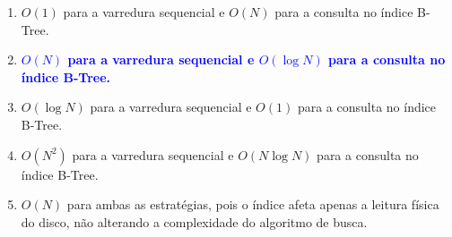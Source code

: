 \documentclass[12pt,a4paper]{article}
\begin{document}
\begin{enumerate}
    \begin{enumerate}[label=\alph*)]
        \item $O(1)$ para a varredura sequencial e $O(N)$ para a consulta no índice B-Tree.
        \item[\textbf{\textcolor{blue}{b)}}] \textcolor{blue}{\textbf{$O(N)$ para a varredura sequencial e $O(\log N)$ para a consulta no índice B-Tree.}}
        \item $O(\log N)$ para a varredura sequencial e $O(1)$ para a consulta no índice B-Tree.
        \item $O(N^2)$ para a varredura sequencial e $O(N \log N)$ para a consulta no índice B-Tree.
        \item $O(N)$ para ambas as estratégias, pois o índice afeta apenas a leitura física do disco, não alterando a complexidade do algoritmo de busca.
    \end{enumerate}

\end{enumerate}
\end{document}
